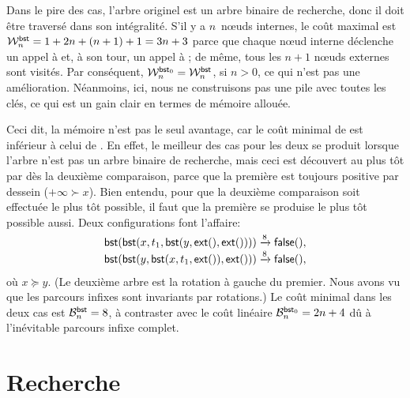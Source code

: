 Dans le pire des cas, l'arbre originel est un arbre binaire de
recherche, donc il doit être traversé dans son intégralité. S'il y a
\(n\)~n{\oe}uds internes, le coût maximal est \(\W{\fun{bst}}{n} = 1 +
2n + (n+1) + 1 = 3n + 3\) parce que
chaque n{\oe}ud interne déclenche un appel à
 et, à son tour, un
appel à ; de même, tous les \(n+1\)
n{\oe}uds externes sont visités. Par conséquent, \(\W{\fun{bst}_0}{n}
= \W{\fun{bst}}{n}\), si \(n > 0\),
ce qui n'est pas une amélioration. Néanmoins, ici, nous ne
construisons pas une pile avec toutes les clés, ce qui est un gain
clair en termes de mémoire allouée.

Ceci dit, la mémoire n'est pas le seul avantage, car le coût minimal
de  est inférieur à celui de
. En effet, le meilleur
des cas pour les deux se produit lorsque l'arbre n'est pas un arbre
binaire de recherche, mais ceci est découvert au plus tôt par
 dès la deuxième comparaison, parce que la première est
toujours positive par dessein (\(+\infty \succ x\)). Bien entendu,
pour que la deuxième comparaison soit effectuée le plus tôt possible,
il faut que la première se produise le plus tôt possible aussi. Deux
configurations font l'affaire:
\begin{align*}
\fun{bst}(\fun{bst}(x,t_1,\fun{bst}(y,\fun{ext}(),\fun{ext}())))
& \xrightarrow{\smash{8}} \fun{false}(),\\
\fun{bst}(\fun{bst}(y,\fun{bst}(x,t_1,\fun{ext}()),\fun{ext}()))
& \xrightarrow{\smash{8}} \fun{false}(),
\end{align*}
où \(x \succcurlyeq y\). (Le deuxième arbre est la rotation à gauche
du premier. Nous avons vu  que les parcours
infixes sont invariants par rotations.) Le coût minimal dans les deux
cas est \(\B{\fun{bst}}{n} = 8\), à
contraster avec le coût linéaire \(\B{\fun{bst}_0}{n} = 2n +
4\) dû à l'inévitable parcours infixe
complet.

\section{Recherche}

